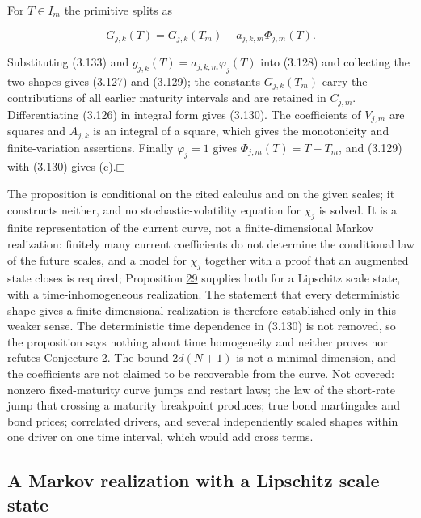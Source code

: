 \documentclass[11pt]{article}
\providecommand{\square}{\mdlgwhtsquare}
\begin{document}
For \(T\in I_m\) the primitive splits as

\begin{equation*}
G_{j,k}(T)=G_{j,k}(T_m)+a_{j,k,m}\Phi_{j,m}(T). \tag{3.133}\label{eq:3.133}
\end{equation*}

Substituting (3.133) and \(g_{j,k}(T)=a_{j,k,m}\varphi_j(T)\) into (3.128) and collecting the two shapes gives (3.127) and (3.129); the constants \(G_{j,k}(T_m)\) carry the contributions of all earlier maturity intervals and are retained in \(C_{j,m}\). Differentiating (3.126) in integral form gives (3.130). The coefficients of \(V_{j,m}\) are squares and \(A_{j,k}\) is an integral of a square, which gives the monotonicity and finite-variation assertions. Finally \(\varphi_j=1\) gives \(\Phi_{j,m}(T)=T-T_m\), and (3.129) with (3.130) gives (c).\hfill$\square$

The proposition is conditional on the cited calculus and on the given scales; it constructs neither, and no stochastic-volatility equation for \(\chi_j\) is solved. It is a finite representation of the current curve, not a finite-dimensional Markov realization: finitely many current coefficients do not determine the conditional law of the future scales, and a model for \(\chi_j\) together with a proof that an augmented state closes is required; Proposition \hyperref[res:Proposition-29]{29} supplies both for a Lipschitz scale state, with a time-inhomogeneous realization. The statement that every deterministic shape gives a finite-dimensional realization is therefore established only in this weaker sense. The deterministic time dependence in (3.130) is not removed, so the proposition says nothing about time homogeneity and neither proves nor refutes Conjecture 2. The bound \(2d(N+1)\) is not a minimal dimension, and the coefficients are not claimed to be recoverable from the curve. Not covered: nonzero fixed-maturity curve jumps and restart laws; the law of the short-rate jump that crossing a maturity breakpoint produces; true bond martingales and bond prices; correlated drivers, and several independently scaled shapes within one driver on one time interval, which would add cross terms.

\subsection{A Markov realization with a Lipschitz scale state}\label{sec:3.26}
\end{document}
